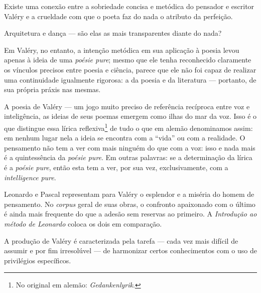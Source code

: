 Existe uma conexão entre a sobriedade concisa e metódica do
pensador e escritor Valéry e a crueldade com que o poeta faz do nada o
atributo da perfeição.

Arquitetura e dança --- são elas as mais transparentes diante do nada?

Em Valéry, no entanto, a intenção metódica em sua aplicação à poesia
levou apenas à ideia de uma \emph{poésie pure}; mesmo que ele tenha
reconhecido claramente os vínculos precisos entre poesia e ciência,
parece que ele não foi capaz de realizar uma continuidade igualmente
rigorosa: a da poesia e da literatura --- portanto, de sua própria práxis
nas mesmas.

A poesia de Valéry --- um jogo muito preciso de referência recíproca entre
voz e inteligência, as ideias de seus poemas emergem como ilhas do mar
da voz. Isso é o que distingue essa lírica reflexiva\footnote{No
  original em alemão: \emph{Gedankenlyrik}. \versal{[N.~T.]}} de tudo o que em alemão denominamos
assim: em nenhum lugar nela a ideia se encontra com a ``vida'' ou com a
realidade. O pensamento não tem a ver com mais ninguém do que com a voz:
isso e nada mais é a quintessência da \emph{poésie pure}. Em outras
palavras: se a determinação da lírica é a \emph{poésie pure}, então esta
tem a ver, por sua vez, exclusivamente, com a \emph{intelligence}
\emph{pure}.

Leonardo e Pascal representam para Valéry o esplendor e a miséria do
homem de pensamento. No \emph{corpus} geral de suas obras, o confronto
apaixonado com o último é ainda mais frequente do que a adesão sem
reservas ao primeiro. A \emph{Introdução ao método de Leonardo} coloca os
dois em comparação.

A produção de Valéry é caracterizada pela tarefa --- cada vez mais
difícil de assumir e por fim irresolúvel --- de harmonizar certos
conhecimentos com o uso de privilégios específicos.


\pagebreak
\thispagestyle{empty}